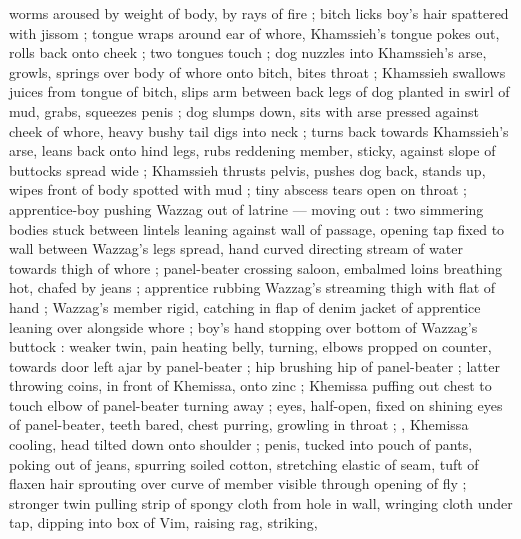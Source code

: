 {worms aroused by weight of body, by rays of fire ; bitch licks boy's hair spattered with jissom ; tongue wraps around ear of whore, Khamssieh's tongue pokes out, rolls back onto cheek ; two tongues touch ; dog nuzzles into Khamssieh's arse, growls, springs over body of whore onto bitch, bites throat ; Khamssieh swallows juices from tongue of bitch, slips arm between back legs of dog planted in swirl of mud, grabs, squeezes penis ; dog slumps down, sits with arse pressed against cheek of whore, heavy bushy tail digs into neck ; turns back towards Khamssieh's arse, leans back onto hind legs, rubs reddening member, sticky, against slope of buttocks spread wide ; Khamssieh thrusts pelvis, pushes dog back, stands up, wipes front of body spotted with mud ; tiny abscess tears open on throat{\td}} ; apprentice-boy pushing Wazzag out of latrine --- moving out : two simmering bodies stuck between lintels {\dashcom} leaning against wall of passage, opening tap fixed to wall between Wazzag's legs spread, hand curved directing stream of water towards thigh of whore ; panel-beater crossing saloon, embalmed loins breathing hot, chafed by jeans ; apprentice rubbing Wazzag's streaming thigh with flat of hand ; Wazzag's member rigid, catching in flap of denim jacket of apprentice leaning over alongside whore ; boy's hand stopping over bottom of Wazzag's buttock{\td}  : weaker twin, pain heating belly, turning, elbows propped on counter, towards door left ajar by panel-beater ; hip brushing hip of panel-beater ; latter throwing coins, in front of Khemissa, onto zinc ; Khemissa puffing out chest to touch elbow of panel-beater turning away ; eyes, half-open, fixed on shining eyes of panel-beater, teeth bared, chest purring, growling in throat ; {\thd}, Khemissa cooling, head tilted down onto shoulder ; penis, tucked into pouch of pants, poking out of jeans, spurring soiled cotton, stretching elastic of seam, tuft of flaxen hair sprouting over curve of member visible through opening of fly ; stronger twin pulling strip of spongy cloth from hole in wall, wringing cloth under tap, dipping into box of Vim, raising rag, striking, 
